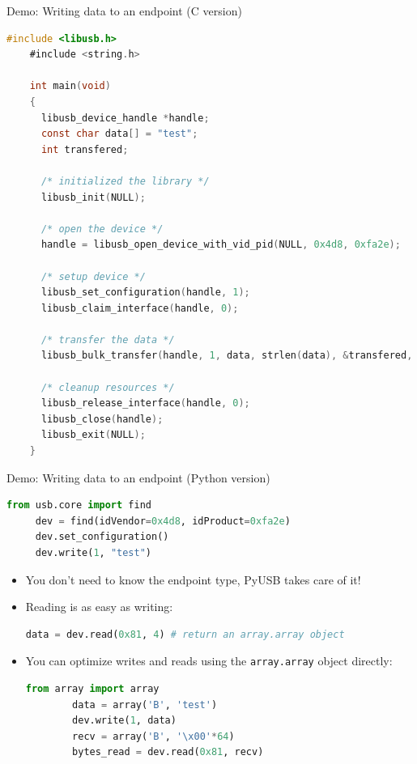 \documentclass[pdf]{beamer}
\begin{document}
\begin{frame}[fragile]{Demo: Writing data to an endpoint (C version)}
  \tiny
  \pause
  \begin{lstlisting}[language=C]
    #include <libusb.h>
    #include <string.h>

    int main(void)
    {
      libusb_device_handle *handle;
      const char data[] = "test";
      int transfered;

      /* initialized the library */
      libusb_init(NULL);

      /* open the device */
      handle = libusb_open_device_with_vid_pid(NULL, 0x4d8, 0xfa2e);

      /* setup device */
      libusb_set_configuration(handle, 1);
      libusb_claim_interface(handle, 0);

      /* transfer the data */
      libusb_bulk_transfer(handle, 1, data, strlen(data), &transfered, 1000);

      /* cleanup resources */
      libusb_release_interface(handle, 0);
      libusb_close(handle);
      libusb_exit(NULL);
    }
  \end{lstlisting}
\end{frame}

\begin{frame}[fragile]{Demo: Writing data to an endpoint (Python version)}
  \tiny
  \pause
  \begin{lstlisting}[language=Python]
     from usb.core import find
     dev = find(idVendor=0x4d8, idProduct=0xfa2e)
     dev.set_configuration()
     dev.write(1, "test")
  \end{lstlisting}

  \begin{itemize}
    \tiny
    \pause
    \item You don't need to know the endpoint type, PyUSB takes care of it!
    \pause
    \item Reading is as easy as writing:
    \begin{lstlisting}[language=Python]
      data = dev.read(0x81, 4) # return an array.array object
    \end{lstlisting}
    \pause
  \item You can optimize writes and reads using the \texttt{array.array} object directly:
      \begin{lstlisting}[language=Python]
        from array import array
        data = array('B', 'test')
        dev.write(1, data)
        recv = array('B', '\x00'*64)
        bytes_read = dev.read(0x81, recv)
      \end{lstlisting}
  \end{itemize}
\end{frame}
\end{document}
